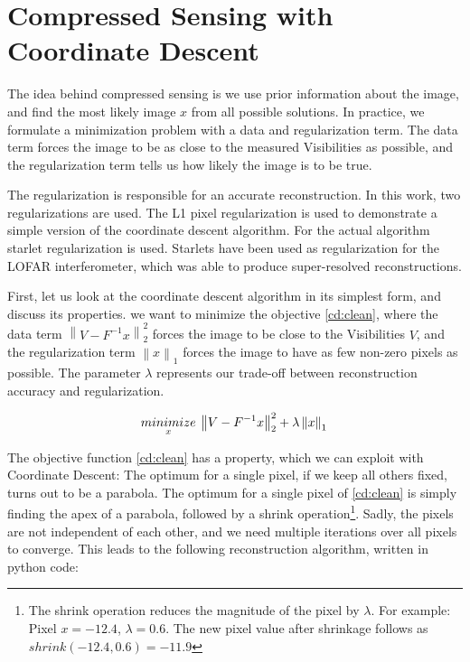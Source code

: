 \section{Compressed Sensing with Coordinate Descent}\label{cd}
The idea behind compressed sensing is we use prior information about the image, and find the most likely image $x$ from all possible solutions. In practice, we formulate a minimization problem with a data and regularization term. The data term forces the image to be as close to the measured Visibilities as possible, and the regularization term tells us how likely the image is to be true. 

The regularization is responsible for an accurate reconstruction. In this work, two regularizations are used. The L1 pixel regularization is used to demonstrate a simple version of the coordinate descent algorithm. For the actual algorithm starlet regularization is used. Starlets have been used as regularization for the LOFAR interferometer\cite{girard2015sparse}, which was able to produce super-resolved reconstructions.

First, let us look at the coordinate descent algorithm in its simplest form, and discuss its properties. we want to minimize the objective \eqref{cd:clean}, where the data term $\left \| V - F^{-1}x \right \|_2^2$ forces the image to be close to the Visibilities $V$, and the regularization term $\left \| x \right \|_1$ forces the image to have as few non-zero pixels as possible. The parameter $\lambda$ represents our trade-off between reconstruction accuracy and regularization. 
 
\begin{equation}\label{cd:clean}
	\underset{x}{minimize} \: \left \| V - F^{-1}x \right \|_2^2 + \lambda \left \| x \right \|_1 \\
\end{equation}

The objective function \eqref{cd:clean} has a property, which we can exploit with Coordinate Descent: The optimum for a single pixel, if we keep all others fixed, turns out to be a parabola. The optimum for a single pixel of \eqref{cd:clean} is simply finding the apex of a parabola, followed by a shrink operation\footnote{The shrink operation reduces the magnitude of the pixel by $\lambda$. For example: Pixel $x = -12.4$, $\lambda = 0.6$. The new pixel value after shrinkage follows as $shrink(-12.4, 0.6) = -11.9$}. Sadly, the pixels are not independent of each other, and we need multiple iterations over all pixels to converge. This leads to the following reconstruction algorithm, written in python code:

